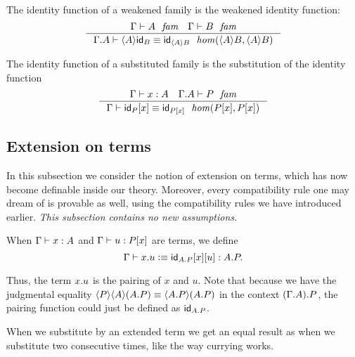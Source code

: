 The identity function of a weakened family is the weakened identity function:
\begin{equation}\label{idfunc-wk-comp}
\inference
  {\jfam{\Gamma}{A}
   \jfam{\Gamma}{B}}
  {\jhomeq{{\Gamma}{A}}{\ctxwk{A}{B}}{\ctxwk{A}{B}}{\ctxwk{A}{\idfunc[B]}}{\idfunc[\ctxwk{A}{B}]}}
\end{equation}

The identity function of a substituted family is the substitution of the identity function
\begin{equation}\label{idfunc-subst-comp}
\inference
  {\jterm{\Gamma}{A}{x}
   \jfam{{\Gamma}{A}}{P}}
  {\jhomeq{\Gamma}{\subst{x}{P}}{\subst{x}{P}}{\subst{x}{\idfunc[P]}}{\idfunc[\subst{x}{P}]}}
\end{equation}

\subsection{Extension on terms}\label{extension-on-terms}
In this subsection we consider the notion of extension on terms, which has now
become definable inside our theory. Moreover, every compatibility rule one may
dream of is provable as well, using the compatibility rules we have introduced
earlier. \emph{This subsection contains no new assumptions.}

\begin{defn}
When $\jterm{\Gamma}{A}{x}$ and $\jterm{\Gamma}{\subst{x}{P}}{u}$ are terms,
we define 
\begin{equation*}
\jtermdefn{\Gamma}{\ctxext{A}{P}}{\ctxext{x}{u}}{\subst{u}{{x}{\idfunc[\ctxext{A}{P}]}}}.
\end{equation*} 
\end{defn}

Thus, the term $\ctxext{x}{u}$ is the pairing of $x$ and $u$. Note that because
we have the judgmental equality 
$\ctxwk{P}{{A}{\ctxext{A}{P}}}\jdeq\ctxwk{\ctxext{A}{P}}{\ctxext{A}{P}}$ in the
context $\ctxext{{\Gamma}{A}}{P}$, the
pairing function could just be defined as $\idfunc[\ctxext{A}{P}]$. 

When we substitute by an extended term we get an equal result as when we
substitute two consecutive times, like the way currying works.

